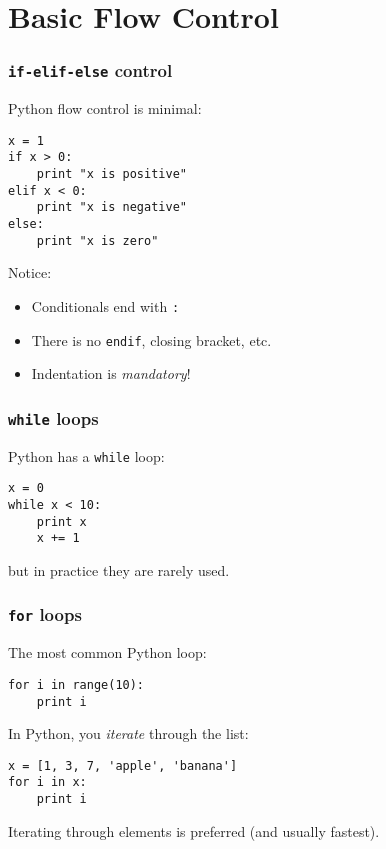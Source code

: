 \documentclass[red]{beamer}
\begin{document}
\section[Flow Control]{Basic Flow Control}
\begin{frame}[fragile]
    \frametitle{\texttt{if-elif-else} control}

    Python flow control is minimal:
    \begin{lstlisting}
x = 1
if x > 0:
    print "x is positive"
elif x < 0:
    print "x is negative"
else:
    print "x is zero"
    \end{lstlisting}

    Notice:
    \begin{itemize}
        \item Conditionals end with \lstinline|:|
        \item There is no \texttt{endif}, closing bracket, etc.
        \item Indentation is \textit{mandatory}!
    \end{itemize}
\end{frame}
\begin{frame}[fragile]
    \frametitle{\texttt{while} loops}
    
    Python has a \lstinline|while| loop:
    \begin{lstlisting}
x = 0
while x < 10:
    print x
    x += 1
    \end{lstlisting}
    but in practice they are rarely used.
\end{frame}
\begin{frame}[fragile]
    \frametitle{\texttt{for} loops}
    
    The most common Python loop:
    \begin{lstlisting}
for i in range(10):
    print i
    \end{lstlisting}

    In Python, you \textit{iterate} through the list:
    \begin{lstlisting}
x = [1, 3, 7, 'apple', 'banana']
for i in x:
    print i
    \end{lstlisting}
    Iterating through elements is preferred (and usually fastest).

\end{frame}
\end{document}
